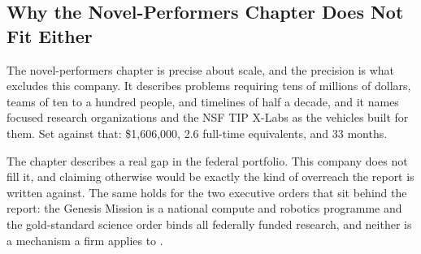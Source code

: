 \subsection{Why the Novel-Performers Chapter Does Not Fit Either}

The novel-performers chapter is precise about scale, and the precision is what
excludes this company. It describes problems requiring tens of millions of
dollars, teams of ten to a hundred people, and timelines of half a decade, and
it names focused research organizations and the NSF TIP X-Labs as the vehicles
built for them. Set against that: \$1,606,000, 2.6 full-time equivalents, and 33
months.

The chapter describes a real gap in the federal portfolio. This company does not
fill it, and claiming otherwise would be exactly the kind of overreach the
report is written against. The same holds for the two executive orders that sit
behind the report: the Genesis Mission is a national compute and robotics
programme and the gold-standard science order binds all federally funded
research, and neither is a mechanism a firm applies to
\cite{eo14363genesismission,eo14303goldstandard}.

